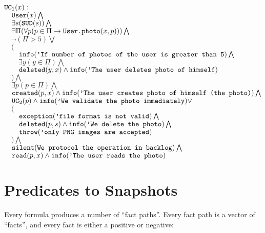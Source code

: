 \documentclass{article}
\begin{document}
        \begin{maths}
        $\mbox{\texttt{UC}}_1(x) : $ \\
        $\quad \mbox{\texttt{User}}(x) \bigwedge$ \\
        $\quad \exists s (\mbox{\texttt{SUD}}(s)) \bigwedge$ \\
        $\quad \exists \Pi(\forall p (p \in \Pi \to \mbox{\texttt{User.photo}}(x, p))) \bigwedge$ \\
        $\quad \neg (\Pi > 5) \bigvee $ \\
        $\quad ($ \\
        $\quad\quad \mbox{\texttt{info}}(\mbox{\texttt{'If number of photos of the user is greater than 5}})\bigwedge$ \\
        $\quad\quad \exists y(y \in \Pi) \bigwedge$ \\
        $\quad\quad \mbox{\texttt{deleted}}(y, x) \wedge \mbox{\texttt{info}}(\mbox{\texttt{'The user deletes photo of himself}})$ \\
        $\quad ) \bigwedge$ \\
        $\quad \exists p(p \in \Pi) \bigwedge$ \\
        $\quad \mbox{\texttt{created}}(p, x) \wedge \mbox{\texttt{info}}(\mbox{\texttt{'The user creates photo of himself (the photo)}})\bigwedge$ \\
        $\quad \mbox{\texttt{UC}}_2(p) \wedge \mbox{\texttt{info}}(\mbox{\texttt{'We validate the photo immediately}}) \vee$ \\
        $\quad ($ \\
        $\quad\quad \mbox{\texttt{exception}}(\mbox{\texttt{'file format is not valid}}) \bigwedge$ \\
        $\quad\quad \mbox{\texttt{deleted}}(p, s) \wedge \mbox{\texttt{info}}(\mbox{\texttt{'We delete the photo}})\bigwedge$ \\
        $\quad\quad \mbox{\texttt{throw}}(\mbox{\texttt{'only PNG images are accepted}})$ \\
        $\quad ) \bigwedge$ \\
        $\quad \mbox{\texttt{silent}}(\mbox{\texttt{We protocol the operation in backlog}})\bigwedge$ \\
        $\quad \mbox{\texttt{read}}(p, x)\wedge \mbox{\texttt{info}}(\mbox{\texttt{'The user reads the photo}})$ \\
        \end{maths}

\section{Predicates to Snapshots}\label{sec:to-snapshots}

    Every formula produces a number of ``fact paths''. Every fact path
    is a vector of ``facts'', and every fact is either a positive or negative:
    
\end{document}
